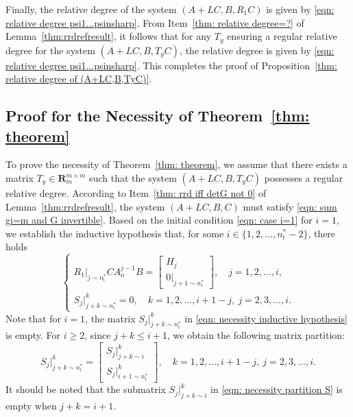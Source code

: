 \documentclass[sort&compress]{elsarticle}
\newcommand\Ao{A_\mathrm o}
\newcommand\nsharp{n_\mathrm i^*}
\newcommand\R{\mathbf R}
\begin{document}
Finally, the relative degree of the system $(A+LC, B, R_1C)$ is
given by \eqref{eqn: relative degree psi1...psinsharp}.
From Item~\ref{thm: relative degree=?} of Lemma~\ref{thm:rrdrefresult},
it follows that for any $T_y$ ensuring a regular relative degree for
the system $(A+LC, B, T_yC)$, the relative degree is given by
\eqref{eqn: relative degree psi1...psinsharp}.
This completes the proof of Proposition~\ref{thm: relative degree of (A+LC,B,TyC)}.

\subsection{Proof for the Necessity of Theorem~\ref{thm: theorem}}

To prove the necessity of Theorem~\ref{thm: theorem},
we assume that there exists a matrix $T_y \in \R^{m \times m}_m$
such that the system $(A+LC, B, T_yC)$ possesses a regular relative degree.
According to Item~\ref{thm: rrd iff detG not 0} of Lemma~\ref{thm:rrdrefresult},
the system $(A+LC, B, C)$ must satisfy \eqref{eqn: sum gi=m and G invertible}.
Based on the initial condition \eqref{eqn: case i=1} for $i=1$,
we establish the inductive hypothesis that,
for some $i \in \{1, 2, \dots, \nsharp-2\}$, there holds
\begin{equation}\label{eqn: necessity inductive hypothesis}
\begin{cases}
R_1|_{j\sim\nsharp} C \Ao^{j-1} B
= \begin{bmatrix} H_j \\ 0|_{j+1\sim\nsharp} \end{bmatrix},
\quad j = 1, 2, \dots, i,
\\
S_j|_{j+k\sim\nsharp}^k = 0,
\quad k = 1, 2, \dots, i+1-j, \
j = 2, 3, \dots, i.
\end{cases}
\end{equation}
Note that for $i=1$, the matrix $S_j|_{j+k\sim\nsharp}^k$ in \eqref{eqn: necessity inductive hypothesis} is empty.
For $i \ge 2$, since $j+k \le i+1$,
we obtain the following matrix partition:
\begin{equation}\label{eqn: necessity partition S}
S_j|_{j+k\sim\nsharp}^k
= \begin{bmatrix}
S_j|_{j+k\sim i}^k \\ S_j|_{i+1\sim\nsharp}^k
\end{bmatrix},
\quad k = 1, 2, \dots, i+1-j, \ j = 2, 3, \dots, i.
\end{equation}
It should be noted that
the submatrix $S_j|_{j+k\sim i}^k$ in \eqref{eqn: necessity partition S} is empty when $j+k=i+1$.
\end{document}
